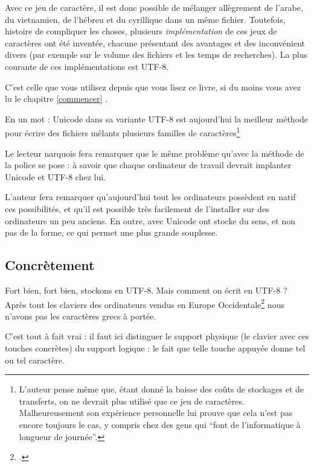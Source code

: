 Avec ce jeu de caractère, il est donc possible de mélanger allègrement de l'arabe, du vietnamien, de l'hébreu et du cyrillique dans un même fichier. Toutefois, histoire de compliquer les choses, plusieurs \emph{implémentation} de ces jeux de caractères ont été inventée, chacune présentant des avantages et des inconvénient divers (par exemple sur le volume des fichiers et les temps de recherches). La plus courante de ces implémentations est UTF-8.

C'est celle que vous utilisez depuis que vous lisez ce livre, si du moins vous avez lu le chapitre \ref{commencer} .

En un mot : Unicode dans sa variante UTF-8 est aujourd'hui la meilleur méthode pour écrire des fichiers mêlants plusieurs familles de caractères\footnote{L'auteur pense même que, étant donné la baisse des coûts de stockages et de transferts, on ne devrait plus utilisé que ce jeu de caractères. Malheureusement son expérience personnelle lui prouve que cela n'est pas encore toujours le cas, y compris chez des gens qui \enquote{font de l'informatique à longueur de journée}.}

\begin{anedocte}Le lecteur narquois fera remarquer que le même problème qu'avec la méthode de la police se pose : à savoir que chaque ordinateur de travail devrait implanter Unicode et UTF-8 chez lui. 

L'auteur fera remarquer qu'aujourd'hui tout les ordinateurs possèdent en natif ces possibilités, et qu'il est possible très facilement de l'installer sur des ordinateurs un peu anciens. En outre, avec Unicode ont stocke du sens, et non pas de la forme, ce qui permet une plus grande souplesse. 

\end{anedocte}

\subsection{Concrètement}

Fort bien, fort bien, stockons en UTF-8. Mais comment on écrit en UTF-8 ? Après tout les claviers des ordinateurs vendus en Europe Occidentale\footcite{Le lecteur militant voudra bien pardonner cet ethnocentrisme.} nous n'avons pas les caractères grecs à portée.

C'est tout à fait vrai : il faut ici distinguer le support physique (le clavier avec ces touches concrètes) du support logique : le fait que telle touche appuyée donne tel ou tel caractère. 

